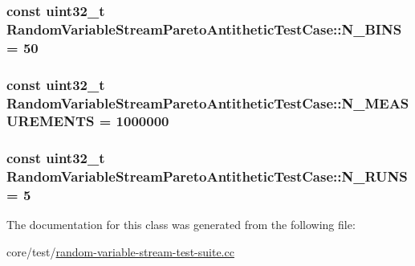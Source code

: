 \subsubsection[{\texorpdfstring{N\+\_\+\+B\+I\+NS}{N_BINS}}]{\setlength{\rightskip}{0pt plus 5cm}const uint32\+\_\+t Random\+Variable\+Stream\+Pareto\+Antithetic\+Test\+Case\+::\+N\+\_\+\+B\+I\+NS = 50\hspace{0.3cm}{\ttfamily [static]}}\hypertarget{classRandomVariableStreamParetoAntitheticTestCase_a558fbee3cdd5c8a42c37f41b0df83b45}{}\label{classRandomVariableStreamParetoAntitheticTestCase_a558fbee3cdd5c8a42c37f41b0df83b45}
\subsubsection[{\texorpdfstring{N\+\_\+\+M\+E\+A\+S\+U\+R\+E\+M\+E\+N\+TS}{N_MEASUREMENTS}}]{\setlength{\rightskip}{0pt plus 5cm}const uint32\+\_\+t Random\+Variable\+Stream\+Pareto\+Antithetic\+Test\+Case\+::\+N\+\_\+\+M\+E\+A\+S\+U\+R\+E\+M\+E\+N\+TS = 1000000\hspace{0.3cm}{\ttfamily [static]}}\hypertarget{classRandomVariableStreamParetoAntitheticTestCase_a776b9649927ade74453b83dd35e0a43e}{}\label{classRandomVariableStreamParetoAntitheticTestCase_a776b9649927ade74453b83dd35e0a43e}
\subsubsection[{\texorpdfstring{N\+\_\+\+R\+U\+NS}{N_RUNS}}]{\setlength{\rightskip}{0pt plus 5cm}const uint32\+\_\+t Random\+Variable\+Stream\+Pareto\+Antithetic\+Test\+Case\+::\+N\+\_\+\+R\+U\+NS = 5\hspace{0.3cm}{\ttfamily [static]}}\hypertarget{classRandomVariableStreamParetoAntitheticTestCase_ae520f9d14ad8332064076ecaeb87f64a}{}\label{classRandomVariableStreamParetoAntitheticTestCase_ae520f9d14ad8332064076ecaeb87f64a}


The documentation for this class was generated from the following file\+:\begin{DoxyCompactItemize}
\item 
core/test/\hyperlink{random-variable-stream-test-suite_8cc}{random-\/variable-\/stream-\/test-\/suite.\+cc}\end{DoxyCompactItemize}
